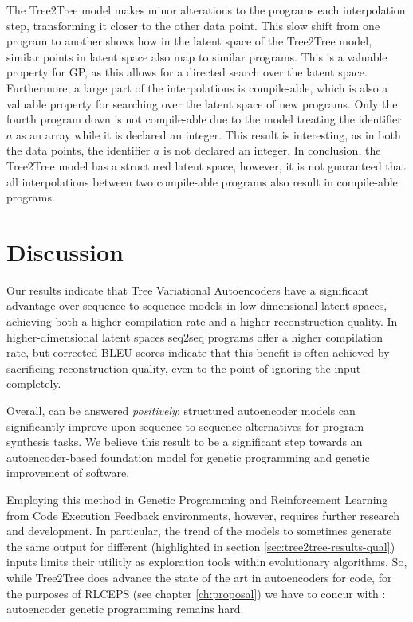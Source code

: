 The Tree2Tree model makes minor alterations to the programs each interpolation step, transforming it closer to the other data point. This slow shift from one program to another shows how in the latent space of the Tree2Tree model, similar points in latent space also map to similar programs. This is a valuable property for GP, as this allows for a directed search over the latent space. Furthermore, a large part of the interpolations is compile-able, which is also a valuable property for searching over the latent space of new programs. Only the fourth program down is not compile-able due to the model treating the identifier $a$ as an array while it is declared an integer. This result is interesting, as in both the data points, the identifier $a$ is not declared an integer. In conclusion, the Tree2Tree model has a structured latent space, however, it is not guaranteed that all interpolations between two compile-able programs also result in compile-able programs.
\newpage
\section{Discussion}

Our results indicate that Tree Variational Autoencoders have a significant advantage over sequence-to-sequence models in low-dimensional latent spaces, achieving both a higher compilation rate and a higher reconstruction quality.
In higher-dimensional latent spaces seq2seq programs offer a higher compilation rate, but corrected BLEU scores indicate that this benefit is often achieved by sacrificing reconstruction quality, even to the point of ignoring the input completely.

Overall, \rqtree{} can be answered \emph{positively}: structured autoencoder models can significantly improve upon sequence-to-sequence alternatives for program synthesis tasks.
We believe this result to be a significant step towards an autoencoder-based foundation model for genetic programming and genetic improvement of software.

Employing this method in Genetic Programming and Reinforcement Learning from Code Execution Feedback environments, however, requires further research and development.
In particular, the trend of the models to sometimes generate the same output for different (highlighted in section \ref{sec:tree2tree-results-qual}) inputs limits their utilitly as exploration tools within evolutionary algorithms.
So, while Tree2Tree does advance the state of the art in autoencoders for code, for the purposes of RLCEPS (see chapter \ref{ch:proposal}) we have to concur with \cite{mcdermottWhyAutoencodingDifficult2019}: autoencoder genetic programming remains hard.

